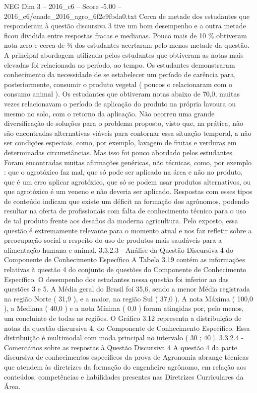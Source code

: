 \begin{textsample}{NEG Dim 3 – 2016\_c6 – Score -5.00 – 2016\_c6/enade\_2016\_agro\_6f2e9fbda0.txt}
Cerca de metade dos estudantes que responderam à questão discursiva 3 tive um bom desempenho e a outra metade ficou dividida entre respostas fracas e medianas.
Pouco mais de 10 \% obtiveram nota zero e cerca de ¾ dos estudantes acertaram pelo menos metade da questão.
A principal abordagem utilizada pelos estudantes que obtiveram as notas mais elevadas foi relacionada ao período, ao tempo.
Os estudantes demonstraram conhecimento da necessidade de se estabelecer um período de carência para, posteriormente, consumir o produto vegetal ( poucos o relacionaram com o consumo animal ).
Os estudantes que obtiveram notas abaixo de 70,0, muitas vezes relacionavam o período de aplicação do produto na própria lavoura ou mesmo no solo, com o retorno da aplicação.
Não ocorreu uma grande diversificação de soluções para o problema proposto, visto que, na prática, não são encontradas alternativas viáveis para contornar essa situação temporal, a não ser condições especiais, como, por exemplo, lavagem de frutas e verduras em determinadas circunstâncias.
Mas isso foi pouco abordado pelos estudantes.
Foram encontradas muitas afirmações genéricas, não técnicas, como, por exemplo : que o agrotóxico faz mal, que só pode ser aplicado na área e não no produto, que é um erro aplicar agrotóxico, que só se podem usar produtos alternativos, ou que agrotóxico é um veneno e não deveria ser aplicado.
Respostas com esses tipos de conteúdo indicam que existe um déficit na formação dos agrônomos, podendo resultar na oferta de profissionais com falta de conhecimento técnico para o uso de tal produto frente aos desafios da moderna agricultura.
Pelo exposto, essa questão é extremamente relevante para o momento atual e nos faz refletir sobre a preocupação social a respeito do uso de produtos mais saudáveis para a alimentação humana e animal. 3.3.2.3 - Análise da Questão Discursiva 4 do Componente de Conhecimento Específico A Tabela 3.19 contém as informações relativas à questão 4 do conjunto de questões do Componente de Conhecimento Específico.
O desempenho dos estudantes nessa questão foi inferior ao das questões 3 e 5.
A Média geral do Brasil foi 35,6, sendo a menor Média registrada na região Norte ( 31,9 ), e a maior, na região Sul ( 37,0 ).
A nota Máxima ( 100,0 ), a Mediana ( 40,0 ) e a nota Mínima ( 0,0 ) foram atingidas por, pelo menos, um concluinte de todas as regiões.
O Gráfico 3.12 representa a distribuição de notas da questão discursiva 4, do Componente de Conhecimento Específico.
Essa distribuição é multimodal com moda principal no intervalo ( 30 ; 40 ]. 3.3.2.4 - Comentários sobre as respostas à Questão Discursiva 4 A questão 4 da parte discursiva de conhecimentos específicos da prova de Agronomia abrange técnicas que atendem às diretrizes da formação do engenheiro agrônomo, em relação aos conteúdos, competências e habilidades presentes nas Diretrizes Curriculares da Área.

\end{textsample}
